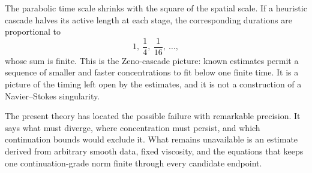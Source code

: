 The parabolic time scale shrinks with the square of the spatial scale.
If a heuristic cascade halves its active length at each stage, the corresponding durations are proportional to
\[
  1,\ \frac14,\ \frac1{16},\ \ldots,
\]
whose sum is finite.
This is the Zeno-cascade picture: known estimates permit a sequence of smaller and faster concentrations to fit below one finite time.
It is a picture of the timing left open by the estimates, and it is not a construction of a Navier--Stokes singularity.

The present theory has located the possible failure with remarkable precision.
It says what must diverge, where concentration must persist, and which continuation bounds would exclude it.
What remains unavailable is an estimate derived from arbitrary smooth data, fixed viscosity, and the equations that keeps one continuation-grade norm finite through every candidate endpoint.
